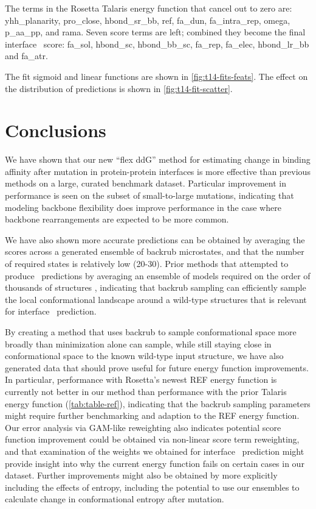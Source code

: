 The terms in the Rosetta Talaris energy function that cancel out to zero are: yhh\_planarity, pro\_close, hbond\_sr\_bb, ref, fa\_dun, fa\_intra\_rep, omega, p\_aa\_pp, and rama.
Seven score terms are left; combined they become the final interface \ddg\ score: fa\_sol, hbond\_sc, hbond\_bb\_sc, fa\_rep, fa\_elec, hbond\_lr\_bb and fa\_atr.

The fit sigmoid and linear functions are shown in \cref{fig:t14-fits-feats}.
The effect on the distribution of predictions is shown in \cref{fig:t14-fit-scatter}.

\section{Conclusions}

We have shown that our new ``flex ddG'' method for estimating change in binding affinity after mutation in protein-protein interfaces is more effective than previous methods on a large, curated benchmark dataset.
Particular improvement in performance is seen on the subset of small-to-large mutations, indicating that modeling backbone flexibility does improve performance in the case where backbone rearrangements are expected to be more common.

We have also shown more accurate predictions can be obtained by averaging the scores across a generated ensemble of backrub microstates, and that the number of required states is relatively low (20-30).
Prior methods that attempted to produce \ddg\ predictions by averaging an ensemble of models required on the order of thousands of structures  \cite{benedix_predicting_2009}, indicating that backrub sampling can efficiently sample the local conformational landscape around a wild-type structures that is relevant for interface \ddg\ prediction.

By creating a method that uses backrub to sample conformational space more broadly than minimization alone can sample, while still staying close in conformational space to the known wild-type input structure, we have also generated data that should prove useful for future energy function improvements.
In particular, performance with Rosetta's newest REF energy function\cite{alford_rosetta_2017} is currently not better in our method than performance with the prior Talaris energy function (\cref{tab:table-ref}), indicating that the backrub sampling parameters might require further benchmarking and adaption to the REF energy function.
Our error analysis via GAM-like reweighting also indicates potential score function improvement could be obtained via non-linear score term reweighting, and that examination of the weights we obtained for interface \ddg\ prediction might provide insight into why the current energy function fails on certain cases in our dataset.
Further improvements might also be obtained by more explicitly including the effects of entropy, including the potential to use our ensembles to calculate change in conformational entropy after mutation.

